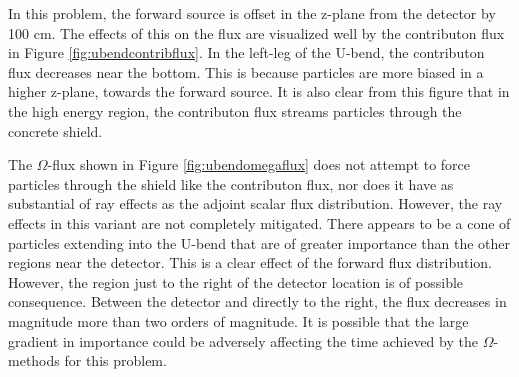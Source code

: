 In this problem, the forward source is offset in the z-plane from the detector by
100 cm. The effects of this on the flux are visualized well by the contributon
flux in Figure \ref{fig:ubendcontribflux}. In the left-leg of the U-bend, the
contributon flux decreases near the bottom. This is because particles are more
biased in a higher z-plane, towards the forward source. It is also clear from
this figure that in the high energy region, the contributon flux streams
particles through the concrete shield.

The $\Omega$-flux shown in Figure \ref{fig:ubendomegaflux} does not attempt to
force particles through the shield like the contributon flux, nor does it have
as substantial of ray effects as the adjoint scalar flux distribution. However,
the ray effects in this variant are not completely mitigated. There appears to
be a cone of particles extending into the U-bend that are of greater importance
than the other regions near the detector. This is a clear effect of the forward
flux distribution. However, the region just to the right of the detector
location is of possible consequence. Between the detector and directly to the
right, the flux decreases in magnitude more than two orders of magnitude. It is
possible that the large gradient in importance could be adversely affecting the
time achieved by the $\Omega$-methods for this problem.

